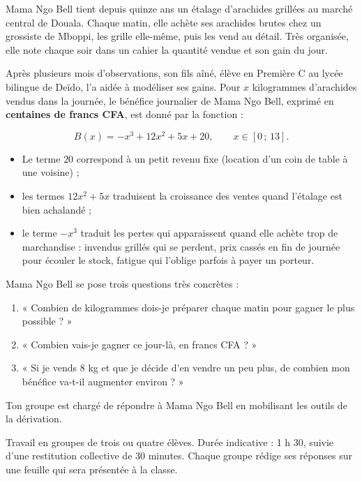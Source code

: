 \documentclass[11pt]{article}
\newcounter{popsec}
\newcounter{popsub}
\newcommand{\courssub}[1]{%
  \stepcounter{popsub}%
  \par\vspace{9pt}\noindent{\popxbold\fontsize{11.5}{13}\selectfont\color{popink}{\color{poporange}\thepopsec.\thepopsub}\hspace{6pt}#1}\par\nopagebreak\vspace{4pt}
}
\begin{document}
\courssub{Situation}

Mama Ngo Bell tient depuis quinze ans un étalage d'arachides grillées au marché central de Douala. Chaque matin, elle achète ses arachides brutes chez un grossiste de Mboppi, les grille elle-même, puis les vend au détail. Très organisée, elle note chaque soir dans un cahier la quantité vendue et son gain du jour.

Après plusieurs mois d'observations, son fils aîné, élève en Première C au lycée bilingue de Deïdo, l'a aidée à modéliser ses gains. Pour $x$ kilogrammes d'arachides vendus dans la journée, le bénéfice journalier de Mama Ngo Bell, exprimé en \textbf{centaines de francs CFA}, est donné par la fonction :

\[ B(x) = -x^3 + 12x^2 + 5x + 20, \qquad x \in [0\,;\,13]. \]

\begin{itemize}
\item Le terme $20$ correspond à un petit revenu fixe (location d'un coin de table à une voisine) ;
\item les termes $12x^2 + 5x$ traduisent la croissance des ventes quand l'étalage est bien achalandé ;
\item le terme $-x^3$ traduit les pertes qui apparaissent quand elle achète trop de marchandise : invendus grillés qui se perdent, prix cassés en fin de journée pour écouler le stock, fatigue qui l'oblige parfois à payer un porteur.
\end{itemize}

Mama Ngo Bell se pose trois questions très concrètes :

\begin{enumerate}
\item « Combien de kilogrammes dois-je préparer chaque matin pour gagner le plus possible ? »
\item « Combien vais-je gagner ce jour-là, en francs CFA ? »
\item « Si je vends $8$ kg et que je décide d'en vendre un peu plus, de combien mon bénéfice va-t-il augmenter environ ? »
\end{enumerate}

Ton groupe est chargé de répondre à Mama Ngo Bell en mobilisant les outils de la dérivation.

\courssub{Consignes}

Travail en groupes de trois ou quatre élèves. Durée indicative : 1 h 30, suivie d'une restitution collective de 30 minutes. Chaque groupe rédige ses réponses sur une feuille qui sera présentée à la classe.
\end{document}
